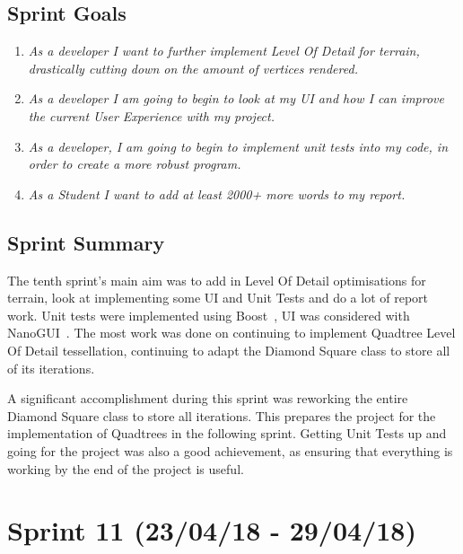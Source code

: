 \documentclass[a4paper,10pt]{report}
\begin{document}
\subsection{Sprint Goals}

\begin{enumerate}

    \item \textit{As a developer I want to further implement Level Of Detail for terrain, drastically cutting down on the amount of vertices rendered.}

    \item \textit{As a developer I am going to begin to look at my UI and how I can improve the current User Experience with my project.}

    \item \textit{As a developer, I am going to begin to implement unit tests into my code, in order to create a more robust program. }
    \item \textit{As a Student I want to add at least 2000+ more words to my report.}

\end{enumerate}

\subsection{Sprint Summary}

The tenth sprint's main aim was to add in Level Of Detail optimisations for terrain, look at implementing some UI and Unit Tests and do a lot of report work. Unit tests were implemented using Boost~\cite{boost}, UI was considered with NanoGUI~\cite{nanogui}. The most work was done on continuing to implement Quadtree Level Of Detail tessellation, continuing to adapt the Diamond Square class to store all of its iterations. \medskip

A significant accomplishment during this sprint was reworking the entire Diamond Square class to store all iterations. This prepares the project for the implementation of Quadtrees in the following sprint. Getting Unit Tests up and going for the project was also a good achievement, as ensuring that everything is working by the end of the project is useful.


\clearpage
\section{Sprint 11 (23/04/18 -  29/04/18)}
\end{document}
